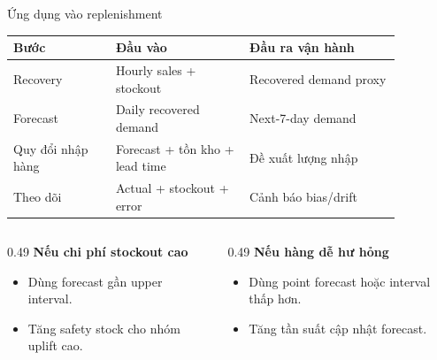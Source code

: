 \documentclass[aspectratio=169,10pt]{beamer}
\begin{document}
\begin{frame}{Ứng dụng vào replenishment}
    \begin{center}
    \begin{tabular}{p{0.23\linewidth}p{0.30\linewidth}p{0.34\linewidth}}
        \toprule
        Bước & Đầu vào & Đầu ra vận hành \\
        \midrule
        Recovery & Hourly sales + stockout & Recovered demand proxy \\
        Forecast & Daily recovered demand & Next-7-day demand \\
        Quy đổi nhập hàng & Forecast + tồn kho + lead time & Đề xuất lượng nhập \\
        Theo dõi & Actual + stockout + error & Cảnh báo bias/drift \\
        \bottomrule
    \end{tabular}
    \end{center}
    \vspace{0.15cm}
    \begin{columns}[T]
        \begin{column}{0.49\linewidth}
            \textbf{Nếu chi phí stockout cao}
            \begin{itemize}
                \item Dùng forecast gần upper interval.
                \item Tăng safety stock cho nhóm uplift cao.
            \end{itemize}
        \end{column}
        \begin{column}{0.49\linewidth}
            \textbf{Nếu hàng dễ hư hỏng}
            \begin{itemize}
                \item Dùng point forecast hoặc interval thấp hơn.
                \item Tăng tần suất cập nhật forecast.
            \end{itemize}
        \end{column}
    \end{columns}
\end{frame}
\end{document}
